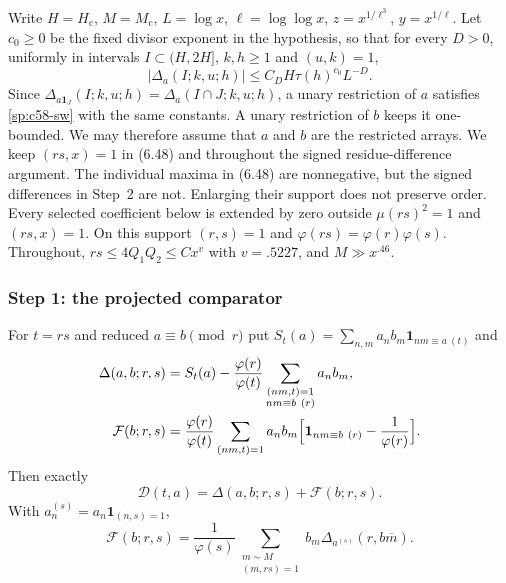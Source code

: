Write $H=H_{\mathrm c}$, $M=M_{\mathrm c}$, $L=\log x$, $\ell=\log\log x$,
$z=x^{1/\ell^3}$, $y=x^{1/\ell}$. Let $c_0\ge0$ be the fixed divisor
exponent in the hypothesis, so that for every $D>0$, uniformly in intervals
$I\subset(H,2H]$, $k,h\ge1$ and $(u,k)=1$,
\begin{equation}\label{sp:c58-sw}
 |\Delta_a(I;k,u;h)|\le C_DH\tau(h)^{c_0}L^{-D}.
\end{equation}
Since $\Delta_{a\mathbf1_J}(I;k,u;h)=\Delta_a(I\cap J;k,u;h)$, a unary
restriction of $a$ satisfies \eqref{sp:c58-sw} with the same constants. A
unary restriction of $b$ keeps it one-bounded. We may therefore assume that
$a$ and $b$ are the restricted arrays. We keep $(rs,x)=1$ in (6.48)
and throughout the signed residue-difference argument. The
individual maxima in (6.48) are nonnegative, but the signed differences in
Step~2 are not. Enlarging their support does not preserve order. Every selected coefficient below is extended by zero outside
$\mu(rs)^2=1$ and $(rs,x)=1$. On this support $(r,s)=1$ and
$\varphi(rs)=\varphi(r)\varphi(s)$. Throughout,
$rs\le4Q_1Q_2\le Cx^{v}$ with $v=.5227$, and $M\gg x^{.46}$.

\subsubsection*{Step 1: the projected comparator}
For $t=rs$ and reduced $a\equiv b\pmod r$ put
$S_t(a)=\sum_{n,m}a_nb_m\mathbf1_{nm\equiv a\ (t)}$ and
\[
\begin{aligned}
 \Delta(a,b;r,s)&=S_t(a)-\frac{\varphi(r)}{\varphi(t)}
 \sum_{\substack{(nm,t)=1\\nm\equiv b\ (r)}}a_nb_m,\\
 \mathcal F(b;r,s)&=\frac{\varphi(r)}{\varphi(t)}\sum_{(nm,t)=1}a_nb_m
 \Bigl[\mathbf1_{nm\equiv b\ (r)}-\frac1{\varphi(r)}\Bigr].
\end{aligned}
\]
Then exactly
\begin{equation}\label{sp:proj-split}
 \mathcal D(t,a)=\Delta(a,b;r,s)+\mathcal F(b;r,s).
\end{equation}
With $a^{(s)}_n=a_n\mathbf1_{(n,s)=1}$,
\begin{equation}\label{sp:F-form}
 \mathcal F(b;r,s)=\frac1{\varphi(s)}\sum_{\substack{m\sim M\\(m,rs)=1}}b_m
 \Delta_{a^{(s)}}(r,b\overline m).
\end{equation}

